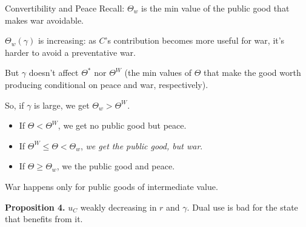 \documentclass[ignorenonframetext,c,12pt]{beamer}
\let\leq=\leqslant %
\let\geq=\geqslant %
\begin{document}
\begin{frame}{Convertibility and Peace}\vspace{0.5em}
  Recall: $\Theta_w$ is the min value of the public good that makes war avoidable.

  $\Theta_w(\gamma)$ is increasing: as $C$'s contribution becomes more useful for war, it's harder to avoid a preventative war.

  But $\gamma$ doesn't affect $\Theta^*$ nor $\Theta^W$ (the min values of $\Theta$ that make the good worth producing conditional on peace and war, respectively).

  So, if $\gamma$ is large, we get $\Theta_w > \Theta^W$.
  \begin{itemize}
    \item If $\Theta < \Theta^W$, we get no public good but peace.
    \item If $\Theta^W \leq \Theta < \Theta_w$, \textit{we get the public good, but war}.
    \item If $\Theta \geq \Theta_w$, we the public good and peace.
  \end{itemize}

  War happens only for public goods of intermediate value.

  \textbf{Proposition 4.} $u_C$ weakly decreasing in $r$ and $\gamma$. Dual use is bad for the state that benefits from it.
\end{frame}
\end{document}
